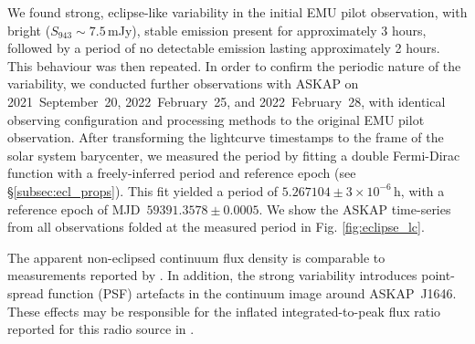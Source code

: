\documentclass[fleqn,usenatbib]{mnras}
\newcommand{\todo}[1]{\textcolor{red}{TODO: #1}\PackageWarning{TODO:}{#1!}}
\newcommand{\fermi}{\textit{Fermi}}
\newcommand{\blinky}{{4FGL}~J1646}
\newcommand{\blinkyaskap}{{ASKAP}~J1646}
\newcommand{\periodh}{$5.267104\pm{3\times 10^{-6}}$}
\begin{document}
We found strong, eclipse-like variability in the initial EMU pilot observation, with bright ($S_{943}\sim 7.5$\,mJy), stable emission present for approximately 3 hours, followed by a period of no detectable emission lasting approximately 2 hours. This behaviour was then repeated. In order to confirm the periodic nature of the variability, we conducted further observations with ASKAP on 2021~September~20, 2022~February~25, and 2022~February~28, with identical observing configuration and processing methods to the original EMU pilot observation. After transforming the lightcurve timestamps to the frame of the solar system barycenter, we measured the period by fitting a double Fermi-Dirac function with a freely-inferred period and reference epoch (see \S \ref{subsec:ecl_props}). This fit yielded a period of \periodh{}\,h, with a reference epoch of MJD~$59391.3578\pm0.0005$. We show the ASKAP time-series from all observations folded at the measured period in Fig. \ref{fig:eclipse_lc}. 

The apparent non-eclipsed continuum flux density is comparable to measurements reported by \citet{2018MNRAS.475..942F}. In addition, the strong variability introduces point-spread function (PSF) artefacts in the continuum image around \blinkyaskap{}. These effects may be responsible for the inflated integrated-to-peak flux ratio reported for this radio source in \citet{2018MNRAS.475..942F}.%



\end{document}
